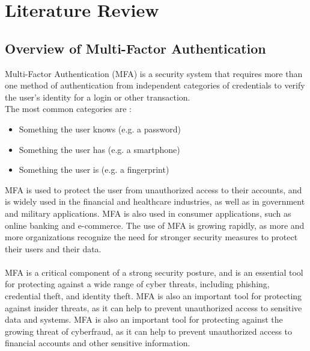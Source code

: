 \documentclass[12pt]{scrbook}
\begin{document}
\newpage \chapter{Literature Review} \section{Overview of Multi-Factor
Authentication}

Multi-Factor Authentication (MFA) is a security system that requires more than
one method of authentication from independent categories of credentials to
verify the user's identity for a login or other transaction.\\The most common
categories are \cite{mfa}: \begin{itemize} \item Something the user knows (e.g.
  a password)

  \item Something the user has (e.g. a smartphone)

\item Something the user is (e.g. a fingerprint) \end{itemize} MFA is used to
  protect the user from unauthorized access to their accounts, and is widely
  used in the financial and healthcare industries, as well as in government and
  military applications. MFA is also used in consumer applications, such as
  online banking and e-commerce. The use of MFA is growing rapidly, as more and
  more organizations recognize the need for stronger security measures to
  protect their users and their data.\\ \\MFA is a critical component of a
  strong security posture, and is an essential tool for protecting against a
  wide range of cyber threats, including phishing, credential theft, and
  identity theft. MFA is also an important tool for protecting against insider
  threats, as it can help to prevent unauthorized access to sensitive data and
  systems. MFA is also an important tool for protecting against the growing
  threat of cyberfraud, as it can help to prevent unauthorized access to
  financial accounts and other sensitive information.\\ \\
\end{document}
